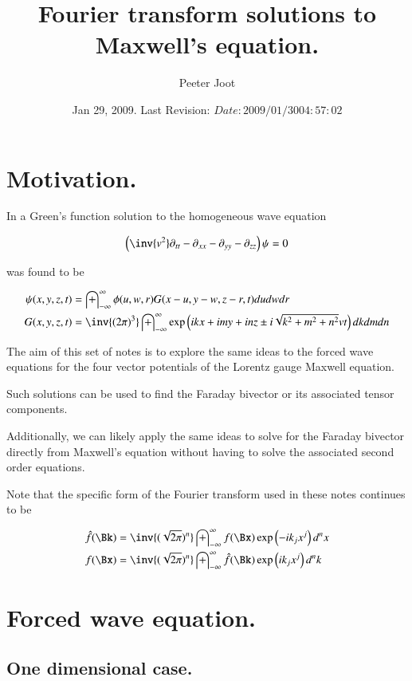\documentclass{article}
\title{ Fourier transform solutions to Maxwell's equation. }
\author{Peeter Joot}
\date{ Jan 29, 2009.  Last Revision: $Date: 2009/01/30 04:57:02 $ }
\newcommand{\IIinf}[0]{ \int_{-\infty}^\infty }
\begin{document}
\maketitle{}

\tableofcontents
\section{ Motivation. }

In \cite{PJwaveFourier} a Green's function solution to the homogeneous
wave equation

\begin{align}\label{eqn:wave}
\left(\inv{v^2} \partial_{tt} -\partial_{xx} -\partial_{yy} -\partial_{zz} \right)\psi = 0
\end{align}

was found to be

\begin{align}\label{eqn:greensSolution3d}
{\psi}(x,y,z,t) &= \IIinf \phi(u,w,r) G( x-u, y-w, z-r, t) du dw dr \\
G(x,y,z,t) &= \inv{({2\pi})^3} \IIinf \exp\left( i k x + i m y + i n z \pm i \sqrt{k^2 + m^2 + n^2} v t \right) dk dm dn
\end{align}

The aim of this set of notes is to explore the same ideas to the forced wave
equations for the four vector potentials of the Lorentz gauge Maxwell equation.

Such solutions can be used to find the Faraday bivector or its associated
tensor components.

Additionally, we can likely apply the same ideas to solve for the Faraday
bivector directly from Maxwell's equation without having to solve the
associated second order equations.

Note that the specific form of the Fourier transform used in these notes continues to be

\begin{align}
\hat{f}(\Bk) &= \inv{(\sqrt{2\pi})^n} \IIinf f(\Bx) \exp\left( -i k_j x^j \right) d^n x \\
{f}(\Bx) &= \inv{(\sqrt{2\pi})^n} \IIinf \hat{f}(\Bk) \exp\left( i k_j x^j \right) d^n k
\end{align}

\section{ Forced wave equation. }

\subsection{ One dimensional case. }
\end{document}
